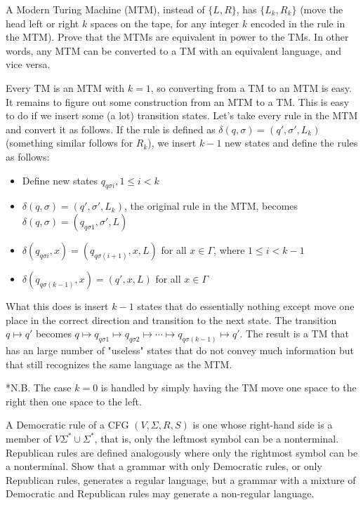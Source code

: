 \documentclass[solution, letterpaper]{cs121}
\begin{document}
\pagebreak

A Modern Turing Machine (MTM), instead of $\{L,R\}$, has $\{L_k, R_k\}$ (move the head left or right $k$ spaces on the tape, for any integer $k$ encoded in the rule in the MTM). Prove that the MTMs are equivalent in power to the TMs. In other words, any MTM can be converted to a TM with an equivalent language, and vice versa.

\begin{solution}
Every TM is an MTM with $k = 1$, so converting from a TM to an MTM is easy.  It remains to figure out some construction from an MTM to a TM.  This is easy to do if we insert some (a lot) transition states.  Let's take every rule in the MTM and convert it as follows.  If the rule is defined as $\delta(q,\sigma) = (q',\sigma',L_k)$ (something similar follows for $R_k$), we insert $k-1$ new states and define the rules as follows:
\begin{itemize}
	\setlength\itemsep{0cm}
	\item Define new states $q_{q\sigma i}, 1 \leq i < k$
	\item $\delta(q,\sigma)=(q',\sigma',L_k)$, the original rule in the MTM, becomes $\delta(q,\sigma)=(q_{q\sigma 1}, \sigma', L)$
	\item $\delta(q_{q\sigma i}, x) = (q_{q\sigma (i+1)}, x, L)$ for all $x \in \Gamma$, where $1 \leq i < k-1$
	\item $\delta(q_{q\sigma (k-1)}, x) = (q', x, L)$ for all $x \in \Gamma$
\end{itemize}

What this does is insert $k-1$ states that do essentially nothing except move one place in the correct direction and transition to the next state.  The transition $q \mapsto q'$ becomes $q \mapsto q_{q\sigma 1} \mapsto q_{q\sigma 2} \mapsto \cdots \mapsto q_{q\sigma (k-1)} \mapsto q'$.  The result is a TM that has an large number of "useless" states that do not convey much information but that still recognizes the same language as the MTM.

*N.B. The case $k = 0$ is handled by simply having the TM move one space to the right then one space to the left.
\end{solution}



A Democratic rule of a CFG $(V, \Sigma, R, S)$ is one whose right-hand side is a member of $V\Sigma^*\cup\Sigma^*$, that is, only the leftmost symbol can be a nonterminal. Republican rules are defined analogously where only the rightmost symbol can be a nonterminal. Show that a grammar with only Democratic rules, or only Republican rules, generates a regular language, but a grammar with a mixture of Democratic and Republican rules may generate a non-regular language.
\end{document}

